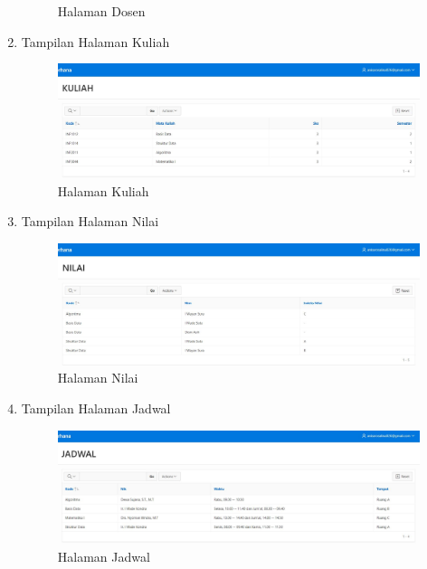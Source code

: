 \begin{enumerate}
\begin{figure}[!htbp]
\begin{center}
    \caption{Halaman Dosen}
    \end{center}   
    \end{figure} 
\item Tampilan Halaman Kuliah
    \begin{figure}[!htbp]
    \begin{center}
    \includegraphics[scale=0.4]{section/ica65.JPG}
    \caption{Halaman Kuliah}
    \end{center}   
    \end{figure} \vspace{3cm}
\item Tampilan Halaman Nilai
    \begin{figure}[!htbp]
    \begin{center}
    \includegraphics[scale=0.4]{section/ica66.JPG}
    \caption{Halaman Nilai}
    \end{center}   
    \end{figure} 
\item Tampilan Halaman Jadwal
    \begin{figure}[!htbp]
    \begin{center}
    \includegraphics[scale=0.4]{section/ica67.JPG}
    \caption{Halaman Jadwal}
    \end{center}   

\end{figure}
\end{enumerate}
